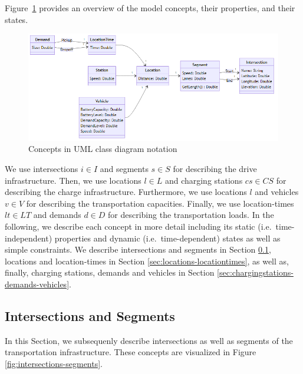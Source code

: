 \documentclass[graybox]{svmult}
\begin{document}
Figure~\ref{fig:concepts} provides an overview of the model concepts, their properties, and their states.
\begin{figure}[t] 
	\centering
	\includegraphics[scale=0.35]{../../diagrams/model/classes-v0.png}
	\caption{Concepts in UML class diagram notation}
	\label{fig:concepts}
\end{figure}
We use intersections $i \in I$ and segments $s \in S$ for describing the drive infrastructure.
Then, we use locations $l \in L$ and charging stations $cs \in CS$ for describing the charge infrastructure.
Furthermore, we use locations $l$ and vehicles $v \in V$ for describing the transportation capacities.
Finally, we use location-times $lt \in LT$ and demands $d \in D$ for describing the transportation loads.
In the following, we describe each concept in more detail including its static (i.e.\ time-independent) properties and dynamic (i.e.\ time-dependent) states as well as simple constraints. We describe intersections and segments in Section \ref{sec:intersections-segments}, locations and location-times in Section \ref{sec:locations-locationtimes}, as well as, finally, charging stations, demands and vehicles in Section \ref{sec:chargingstations-demands-vehicles}.
\vspace{-2mm}

\subsection{Intersections and Segments}
\label{sec:intersections-segments}
In this Section, we subsequenly describe intersections as well as segments of the transportation infrastructure. These concepts are visualized in Figure \ref{fig:intersections-segments}.
\end{document}
